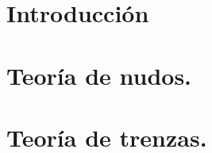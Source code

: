 \documentclass[a4paper,12pt]{book}
\begin{document}
	\newtheorem{teo}{Teorema}[section]
	\newtheorem{pro}{Proposición}[section]
	\newtheorem{lem}{Lema}[section]
	\newtheorem{cor}{Corolario}[section]


\frontmatter
{}


\tableofcontents
\listoffigures

\mainmatter
\chapter{Introducción}
\label{ch0}


\chapter{Teoría de nudos.}
\label{ch1}








\chapter{Teoría de trenzas.}
\label{ch2}


\end{document}
